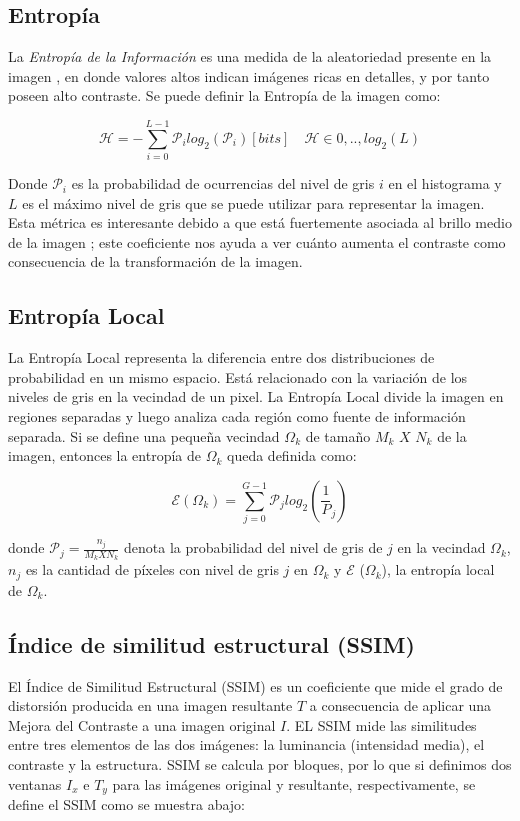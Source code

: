 \documentclass[spanish,twocolumn]{article}
\begin{document}
\subsection{Entropía}
\label{ssec:entropia}

La {\it Entropía de la Información} es una medida de la aleatoriedad presente en la imagen \cite{tsai2008information}, en donde valores altos indican imágenes ricas en detalles, y por tanto poseen alto contraste. Se puede definir la Entropía de la imagen como: 

\begin{equation}\label{eq:entropia}
\mathscr{H}=-\sum_{i=0}^{L-1}\mathcal{P}_i log_2(\mathcal{P}_i) [bits] \quad \mathscr{H} \in {0,..,log_2(L)} 
\end{equation}

Donde $\mathcal{P}_i$ es la probabilidad de ocurrencias del nivel de gris $i$ en el histograma y $L$ es el máximo nivel de gris que se puede utilizar para representar la imagen. Esta métrica es interesante debido a que está fuertemente asociada al brillo medio de la imagen \cite{108593}; este coeficiente nos ayuda a ver cuánto aumenta el contraste como consecuencia de la transformación de la imagen.

\subsection{Entropía Local}
\label{ssec:entropialocal}
La Entropía Local \cite{localentropy} representa la diferencia entre dos distribuciones de probabilidad en un mismo espacio. Está relacionado con la variación de los niveles de gris en la vecindad de un pixel. La Entropía Local divide la imagen en regiones separadas y luego analiza cada región como fuente de información separada.
Si se define una pequeña vecindad $\Omega_k$ de tamaño $M_k$ $X$ $N_k$ de la imagen, entonces la entropía de $\Omega_k$ queda definida como:

\begin{equation}\label{eq:entropialocal}
 \mathscr E{(\Omega_k)}=\sum_{j=0}^{G-1}\mathcal P_j log_2(\frac{1}{P}_j)
\end{equation}

donde $\mathcal P_j=\frac{n_j}{M_k X N_k}$ denota la probabilidad del nivel de gris de $j$ en la vecindad  $\Omega_k$, $n_j$ es la cantidad de píxeles con nivel de gris $j$ en  $\Omega_k$ y  $\mathscr E$ ($\Omega_k$), la entropía local de  $\Omega_k$.

\subsection{Índice de similitud estructural (SSIM)}
\label{ssec:ssim}
El {Índice de Similitud Estructural (SSIM)} \cite{wang2004image} es un coeficiente que mide el grado de distorsión producida en una imagen resultante $T$ a consecuencia de aplicar una Mejora del Contraste a una imagen original $I$. 
EL SSIM mide las similitudes entre tres elementos de las dos imágenes: la luminancia (intensidad media), el contraste y la estructura. SSIM se calcula por bloques, por lo que si definimos dos ventanas $I_x$ e $T_y$ para las imágenes original y resultante, respectivamente, se define el SSIM como se muestra abajo:
\end{document}
